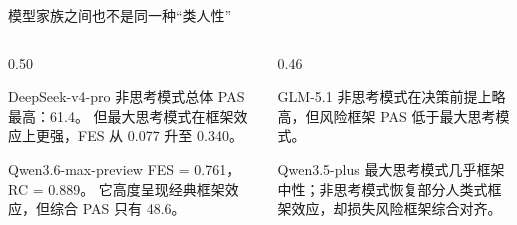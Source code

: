 \begin{frame}{模型家族之间也不是同一种“类人性”}
  \begin{columns}[T,totalwidth=\textwidth]
    \begin{column}{0.50\textwidth}
      \begin{block}{DeepSeek-v4-pro}
        非思考模式总体 PAS 最高：61.4。
        但最大思考模式在框架效应上更强，FES 从 0.077 升至 0.340。
      \end{block}
      \begin{block}{Qwen3.6-max-preview}
        FES = 0.761，RC = 0.889。
        它高度呈现经典框架效应，但综合 PAS 只有 48.6。
      \end{block}
    \end{column}
    \begin{column}{0.46\textwidth}
      \begin{block}{GLM-5.1}
        非思考模式在决策前提上略高，但风险框架 PAS 低于最大思考模式。
      \end{block}
      \begin{block}{Qwen3.5-plus}
        最大思考模式几乎框架中性；非思考模式恢复部分人类式框架效应，却损失风险框架综合对齐。
      \end{block}
    \end{column}
  \end{columns}

\end{frame}

